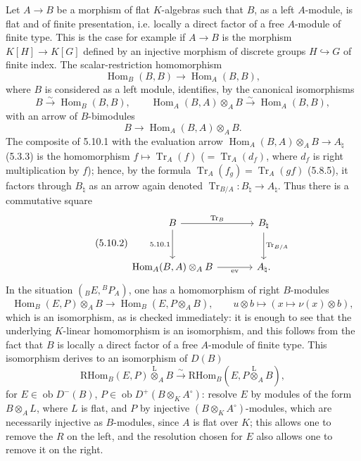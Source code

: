 \documentclass[11pt]{article}
\DeclareMathOperator{\Hom}{Hom}
\newcommand{\ob}{\operatorname{ob}}
\providecommand{\RHom}{\mathrm{RHom}}
\providecommand{\Tr}{\operatorname{Tr}}
\providecommand{\Tr}{\operatorname{Tr}}
\providecommand{\lten}{\overset{\mathrm L}{\otimes}}
\providecommand{\Tr}{\operatorname{Tr}}
\providecommand{\RHom}{\mathrm{RHom}}
\providecommand{\Hom}{\operatorname{Hom}}
\providecommand{\ob}{\operatorname{ob}}
\providecommand{\lten}{\overset{\mathrm L}{\otimes}}
\providecommand{\RHom}{\mathrm R\mathcal{H}om}
\providecommand{\lten}{\overset{\mathrm L}{\otimes}}
\providecommand{\Tr}{\operatorname{Tr}}
\providecommand{\lten}{\overset{\mathrm L}{\otimes}}
\providecommand{\lten}{\overset{\mathrm L}{\otimes}}
\providecommand{\lten}{\overset{\mathrm L}{\otimes}}
\providecommand{\RHom}{\mathrm{RHom}}
\begin{document}
Let $A\to B$ be a morphism of flat $K$-algebras such that $B$, as a left $A$-module, is flat and of finite presentation, i.e. locally a direct factor of a free $A$-module of finite type. This is the case for example if $A\to B$ is the morphism $K[H]\to K[G]$ defined by an injective morphism of discrete groups $H\hookrightarrow G$ of finite index. The scalar-restriction homomorphism
\[
\Hom_B(B,B)\longrightarrow\Hom_A(B,B),
\]
where $B$ is considered as a left module, identifies, by the canonical isomorphisms
\[
B\xrightarrow{\sim}\Hom_B(B,B),\qquad \Hom_A(B,A)\otimes_AB\xrightarrow{\sim}\Hom_A(B,B),
\]
with an arrow of $B$-bimodules
\begin{equation}\tag{5.10.1}
B\longrightarrow\Hom_A(B,A)\otimes_AB.
\end{equation}
The composite of 5.10.1 with the evaluation arrow $\Hom_A(B,A)\otimes_AB\to A_\natural$ (5.3.3) is the homomorphism $f\mapsto\Tr_A(f)$ ($=\Tr_A(d_f)$, where $d_f$ is right multiplication by $f$); hence, by the formula $\Tr_A(f_g)=\Tr_A(gf)$ (5.8.5), it factors through $B_\natural$ as an arrow again denoted $\Tr_{B/A}:B_\natural\to A_\natural$. Thus there is a commutative square
\begin{equation}\tag{5.10.2}
\begin{tikzcd}[column sep=large,row sep=large]
B \arrow[r,"\Tr_B"] \arrow[d,"5.10.1"'] & B_\natural \arrow[d,"\Tr_{B/A}"]\\
\Hom_A(B,A)\otimes_AB \arrow[r,"\mathrm{ev}"'] & A_\natural .
\end{tikzcd}
\end{equation}
In the situation $({}_BE,{}^BP_A)$, one has a homomorphism of right $B$-modules
\begin{equation}\tag{5.10.3}
\Hom_B(E,P)\otimes_AB\longrightarrow\Hom_B(E,P\otimes_AB),\qquad
u\otimes b\longmapsto(x\longmapsto\nu(x)\otimes b),
\end{equation}
which is an isomorphism, as is checked immediately: it is enough to see that the underlying $K$-linear homomorphism is an isomorphism, and this follows from the fact that $B$ is locally a direct factor of a free $A$-module of finite type. This isomorphism derives to an isomorphism of $D(B)$
\begin{equation}\tag{5.10.4}
\RHom_B(E,P)\lten_AB\xrightarrow{\sim}\RHom_B(E,P\lten_AB),
\end{equation}
for $E\in\ob D^-(B)$, $P\in\ob D^+(B\otimes_KA^\circ)$: resolve $E$ by modules of the form $B\otimes_AL$, where $L$ is flat, and $P$ by injective $(B\otimes_KA^\circ)$-modules, which are necessarily injective as $B$-modules, since $A$ is flat over $K$; this allows one to remove the $R$ on the left, and the resolution chosen for $E$ also allows one to remove it on the right.
\end{document}

